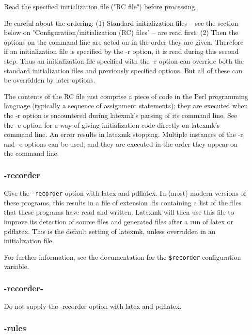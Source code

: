 Read the specified initialization file ("RC file")  before  processing.

Be careful about the ordering: (1) Standard initialization files -- see the
section below on  "Configuration/initialization  (RC) files"  --  are read
first.  (2) Then the options on the command line are acted on in the order they
are given.  Therefore if  an initialization  file  is  specified by the -r
option, it is read during this second step.  Thus an initialization file
specified with the -r option can override both the standard initialization
files and previously specified options.  But all of these can be overridden by
later options.

The contents of the RC file just comprise a piece of code in the Perl
programming language (typically a  sequence  of  assignment statements); they
are executed when the -r option is encountered during latexmk's parsing of its
command line.  See the -e option for  a  way  of giving initialization code
directly on latexmk's command line.  An error results in latexmk  stopping.
Multiple instances of the -r and -e options can be used, and they are executed
in the order they appear on the command line.


\subsubsection{-recorder}

Give the \verb|-recorder| option with latex and  pdflatex.   In  (most) modern
versions of these programs, this results in a file of extension .fls
containing a list of the files that these  programs have  read  and written.
Latexmk will then use this file to improve its detection of source files and
generated files after  a run  of  latex  or pdflatex.  This is the default
setting of latexmk, unless overridden in an initialization file.

For further information, see the documentation for the \verb|$recorder| configuration
variable.


\subsubsection{-recorder-}

Do not supply the -recorder option with latex and pdflatex.

\subsubsection{-rules}

